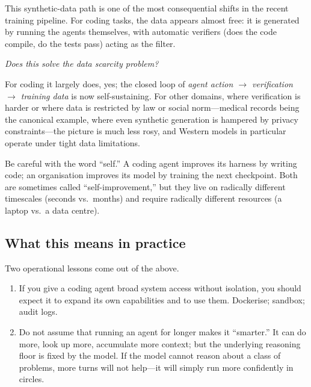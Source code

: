 This synthetic-data path is one of the most consequential
shifts in the recent training pipeline.  For coding tasks,
the data appears almost free: it is generated by running the
agents themselves, with automatic verifiers (does the code
compile, do the tests pass) acting as the filter.

\begin{audience}
  \emph{Does this solve the data scarcity problem?}

  For coding it largely does, yes; the closed loop of
  \emph{agent action $\to$ verification $\to$ training data}
  is now self-sustaining.  For other domains, where verification
  is harder or where data is restricted by law or social
  norm---medical records being the canonical example, where
  even synthetic generation is hampered by privacy
  constraints---the picture is much less rosy, and Western
  models in particular operate under tight data limitations.
\end{audience}

\begin{remark}
  Be careful with the word ``self.''  A coding agent improves
  its harness by writing code; an organisation improves its
  model by training the next checkpoint.  Both are sometimes
  called ``self-improvement,'' but they live on radically
  different timescales (seconds vs.\ months) and require
  radically different resources (a laptop vs.\ a data centre).
\end{remark}

\subsection{What this means in practice}

Two operational lessons come out of the above.

\begin{enumerate}[(1)]
  \item If you give a coding agent broad system access without
    isolation, you should expect it to expand its own
    capabilities and to use them.  Dockerise; sandbox;
    audit logs.
  \item Do not assume that running an agent for longer makes
    it ``smarter.''  It can do more, look up more, accumulate
    more context; but the underlying reasoning floor is fixed
    by the model.  If the model cannot reason about a class of
    problems, more turns will not help---it will simply run
    more confidently in circles.
\end{enumerate}
